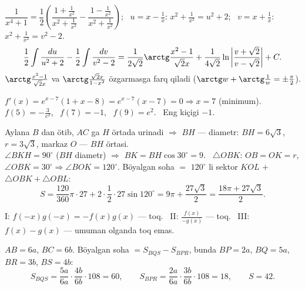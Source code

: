 $\dfrac1{x^4+1}=\dfrac12\left(\dfrac{1+\frac1{x^2}}{x^2+\frac1{x^2}}-\dfrac{1-\frac1{x^2}}{x^2+\frac1{x^2}}\right)$; \ $u=x-\frac1x$: $x^2+\frac1{x^2}=u^2+2$; \ $v=x+\frac1x$: $x^2+\frac1{x^2}=v^2-2$.
\[\frac12\int\frac{du}{u^2+2}-\frac12\int\frac{dv}{v^2-2}=\frac1{2\sqrt2}\arctg\frac{x^2-1}{\sqrt2x}+\frac1{4\sqrt2}\ln\left|\frac{v+\sqrt2}{v-\sqrt2}\right|+C.\]
$\arctg\frac{x^2-1}{\sqrt2x}$ va $\arctg\frac{\sqrt2x}{1-x^2}$ özgarmasga farq qiladi ($\arctg w+\arctg\frac1w=\pm\frac\pi2$).

$f'(x)=e^{x-7}(1+x-8)=e^{x-7}(x-7)=0\Rightarrow x=7$ (minimum).\\
$f(5)=-\frac3{e^2}$, \ $f(7)=-1$, \ $f(9)=e^2$. \ Eng kiçigi $-1$.

Aylana $B$ dan ötib, $AC$ ga $H$ örtada urinadi $\Rightarrow$ $BH$ — diametr: $BH=6\sqrt3$, $r=3\sqrt3$, markaz $O$ — $BH$ örtasi.\\
$\angle BKH=90^\circ$ ($BH$ diametr) $\Rightarrow$ $BK=BH\cos30^\circ=9$. \ $\triangle OBK$: $OB=OK=r$, $\angle OBK=30^\circ\Rightarrow\angle BOK=120^\circ$.
Böyalgan soha $=$ $120^\circ$ li sektor $KOL$ $+$ $\triangle OBK+\triangle OBL$:
\[S=\frac{120}{360}\pi\cdot27+2\cdot\frac12\cdot27\sin120^\circ=9\pi+\frac{27\sqrt3}2=\frac{18\pi+27\sqrt3}2.\]

I: $f(-x)g(-x)=-f(x)g(x)$ — toq. \ II: $\frac{f(x)}{-g(x)}$ — toq. \ III: $f(x)-g(x)$ — umuman olganda toq emas.

$AB=6a$, $BC=6b$. Böyalgan soha $=S_{BQS}-S_{BPR}$, bunda $BP=2a$, $BQ=5a$, $BR=3b$, $BS=4b$:
\[S_{BQS}=\frac{5a}{6a}\cdot\frac{4b}{6b}\cdot108=60,\qquad S_{BPR}=\frac{2a}{6a}\cdot\frac{3b}{6b}\cdot108=18,\qquad S=42.\]

